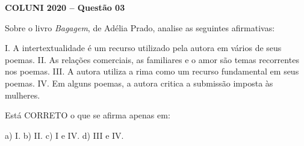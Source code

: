 \textbf{COLUNI 2020 -- Questão 03}\par\medskip Sobre o livro \textit{Bagagem}, de Adélia Prado, analise as seguintes afirmativas:

\par

I.    A intertextualidade é um recurso utilizado pela autora em vários de seus poemas. II. As relações comerciais, as familiares e o amor são temas recorrentes nos poemas. III. A autora utiliza a rima como um recurso fundamental em seus poemas. IV. Em alguns poemas, a autora critica a submissão imposta às mulheres.

\par

Está CORRETO o que se afirma apenas em:

\par

a) I. b) II. c) I e IV. d) III e IV.
